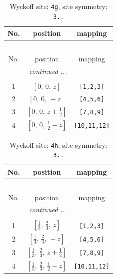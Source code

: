 \documentclass[fleqn,8pt]{jsarticle}
\begin{document}
\begin{longtable}{ccc}
\caption{Wyckoff site: {\tt 4g}, site symmetry: {\tt 3..}}
 \\
 \hline \hline
No. & position & mapping \\ \hline \endfirsthead

\multicolumn{2}{l}{\tablename\ \thetable{}} \\
 \hline \hline
No. & position & mapping \\ \hline \endhead

 \hline \hline
\multicolumn{2}{r}{\footnotesize\it continued ...} \\ \endfoot

 \hline \hline
\multicolumn{2}{r}{} \\ \endlastfoot

1 & $\left[ 0,\, 0,\, z \right]$ & {\tt [1,2,3]} \\ \hline
2 & $\left[ 0,\, 0,\, - z \right]$ & {\tt [4,5,6]} \\ \hline
3 & $\left[ 0,\, 0,\, z + \frac{1}{2} \right]$ & {\tt [7,8,9]} \\ \hline
4 & $\left[ 0,\, 0,\, \frac{1}{2} - z \right]$ & {\tt [10,11,12]} \\
\end{longtable}
\renewcommand{\arraystretch}{1.2}
\begin{longtable}{ccc}
\caption{Wyckoff site: {\tt 4h}, site symmetry: {\tt 3..}}
 \\
 \hline \hline
No. & position & mapping \\ \hline \endfirsthead

\multicolumn{2}{l}{\tablename\ \thetable{}} \\
 \hline \hline
No. & position & mapping \\ \hline \endhead

 \hline \hline
\multicolumn{2}{r}{\footnotesize\it continued ...} \\ \endfoot

 \hline \hline
\multicolumn{2}{r}{} \\ \endlastfoot

1 & $\left[ \frac{1}{3},\, \frac{2}{3},\, z \right]$ & {\tt [1,2,3]} \\ \hline
2 & $\left[ \frac{1}{3},\, \frac{2}{3},\, - z \right]$ & {\tt [4,5,6]} \\ \hline
3 & $\left[ \frac{1}{3},\, \frac{2}{3},\, z + \frac{1}{2} \right]$ & {\tt [7,8,9]} \\ \hline
4 & $\left[ \frac{1}{3},\, \frac{2}{3},\, \frac{1}{2} - z \right]$ & {\tt [10,11,12]} \\
\end{longtable}
\end{document}
